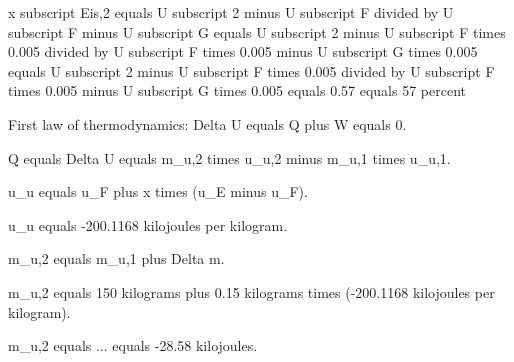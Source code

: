 x subscript Eis,2 equals U subscript 2 minus U subscript F divided by U subscript F minus U subscript G equals U subscript 2 minus U subscript F times 0.005 divided by U subscript F times 0.005 minus U subscript G times 0.005 equals U subscript 2 minus U subscript F times 0.005 divided by U subscript F times 0.005 minus U subscript G times 0.005 equals 0.57 equals 57 percent

First law of thermodynamics: Delta U equals Q plus W equals 0.  

Q equals Delta U equals m_u,2 times u_u,2 minus m_u,1 times u_u,1.  

u_u equals u_F plus x times (u_E minus u_F).  

u_u equals -200.1168 kilojoules per kilogram.  

m_u,2 equals m_u,1 plus Delta m.  

m_u,2 equals 150 kilograms plus 0.15 kilograms times (-200.1168 kilojoules per kilogram).  

m_u,2 equals ... equals -28.58 kilojoules.
